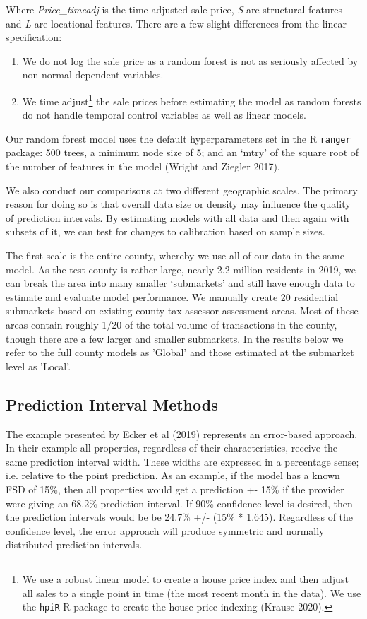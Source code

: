 \documentclass[colTwo]{format}
\theoremstyle{definition}
\begin{document}
Where \textit{Price\_timeadj} is the time adjusted sale price, \textit{S} are structural features and \textit{L} are locational features. There are a few slight differences from the linear specification:

\begin{enumerate}
\item We do not log the sale price as a random forest is not as seriously affected by non-normal dependent variables.
\item We time adjust\footnote{We use a robust linear model to create a house price index and then adjust all sales to a single point in time (the most recent month in the data).  We use the \texttt{hpiR} R package to create the house price indexing (Krause 2020). } the sale prices before estimating the model as random forests do not handle temporal control variables as well as linear models. 
\end{enumerate}

Our random forest model uses the default hyperparameters set in the R \texttt{ranger} package: 500 trees, a minimum node size of 5; and an ‘mtry’ of the square root of the number of features in the model (Wright and Ziegler 2017). 

We also conduct our comparisons at two different geographic scales.  The primary reason for doing so is that overall data size or density may influence the quality of prediction intervals.  By estimating models with all data and then again with subsets of it, we can test for changes to calibration based on sample sizes.  

The first scale is the entire county, whereby we use all of our data in the same model.  As the test county is rather large, nearly 2.2 million residents in 2019, we can break the area into many smaller ‘submarkets’ and still have enough data to estimate and evaluate model performance.  We manually create 20 residential submarkets based on existing county tax assessor assessment areas.  Most of these areas contain roughly 1/20 of the total volume of transactions in the county, though there are a few larger and smaller submarkets. In the results below we refer to the full county models as 'Global' and those estimated at the submarket level as 'Local'. 
 
\subsection{Prediction Interval Methods}

The example presented by Ecker et al (2019) represents an error-based approach. In their example all properties, regardless of their characteristics, receive the same prediction interval width.  These widths are expressed in a percentage sense; i.e. relative to the point prediction. As an example,  if the model has a known FSD of 15\%, then all properties would get a prediction +- 15\% if the provider were giving an 68.2\% prediction interval.  If 90\% confidence level is desired, then the prediction intervals would be be 24.7\% +/- (15\% * 1.645).  Regardless of the confidence level, the error approach will produce symmetric and normally distributed prediction intervals. 
\end{document}

